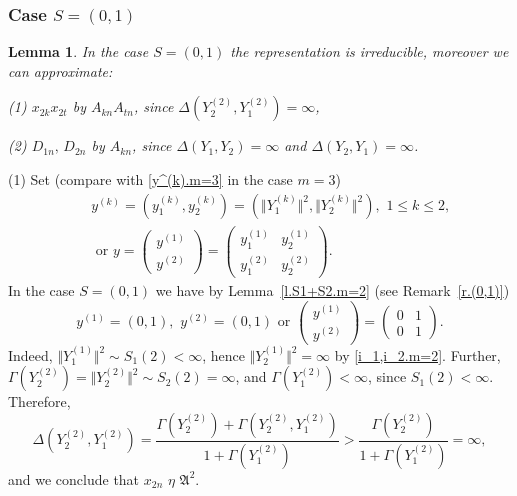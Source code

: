 \documentclass[preprint,12pt]{elsarticle}
\newtheorem{lem}[thm]{Lemma}
\numberwithin{equation}{section}
\begin{document}
\subsubsection{Case  $S=(0,1)$}
%
\begin{lem}
\label{(0,1).m=2} 
In the case  $S=(0,1)$ the  representation is irreducible, moreover we can approximate: \par
{\rm (1)} $x_{2k}x_{2t}$   by $A_{kn}A_{tn}$, since $\Delta(Y_2^{(2)},Y_1^{(2)})=\infty$, \par
{\rm (2)} $D_{1n},\,D_{2n}$ by $A_{kn}$, since   $\Delta(Y_1,Y_2)=\infty$ and $\Delta(Y_2,Y_1)=\infty$.
\end{lem}
%
\begin{pf}
%
(1) Set (compare with \eqref{y^(k).m=3} in the case $m=3$)
\begin{eqnarray}
 \label{y^(k).m=2}
&&y^{(k)}=(y_1^{(k)},y_2^{(k)})=(\Vert Y_1^{(k)}\Vert^2,\Vert Y_2^{(k)}\Vert^2),\,\,1\leq k\leq 2,\\
\label{y-mat.m=2}
&&\,\,\text{or}\,\,y=
\left(\begin{array}{c}
y^{(1)}\\
y^{(2)}
\end{array}\right)=\left(\begin{array}{cc}
y_1^{(1)}&y_2^{(1)}\\
y_1^{(2)}&y_2^{(2)}
\end{array}\right).
\end{eqnarray}
In the case $S=(0,1)$ we have by Lemma~\ref{l.S1+S2.m=2} (see Remark~\ref{r.(0,1)})
\begin{equation}
\label{S=(0,1)} 
y^{(1)}=(0,1),\,\,y^{(2)}=(0,1)\,\,\text{or}\,\,
\left(\begin{array}{c}
y^{(1)}\\
y^{(2)}
\end{array}\right)=\left(\begin{array}{cc}
0&1\\
0&1
\end{array}\right).
\end{equation}
%
Indeed,   $\Vert Y_1^{(1)} \Vert^2\sim S_1(2)<\infty$, hence $\Vert Y_2^{(1)} \Vert^2=\infty$ by \eqref{i_1,i_2.m=2}.
Further, $\Gamma(Y_2^{(2)})=\Vert Y_2^{(2)} \Vert^2\sim S_2(2)=\infty$, and $\Gamma(Y_1^{(2)})<\infty$, since 
$S_1(2)<\infty$. Therefore,
$$
\Delta(Y_2^{(2)},Y_1^{(2)})=\frac{\Gamma(Y_2^{(2)})+\Gamma(Y_2^{(2)},Y_1^{(2)})}{1+\Gamma(Y_1^{(2)})}>
\frac{\Gamma(Y_2^{(2)})}{1+\Gamma(Y_1^{(2)})}=\infty,
$$
and we conclude that $x_{2n}\,\,\eta\,\,{\mathfrak A}^2$. 


\end{pf}
\end{document}
